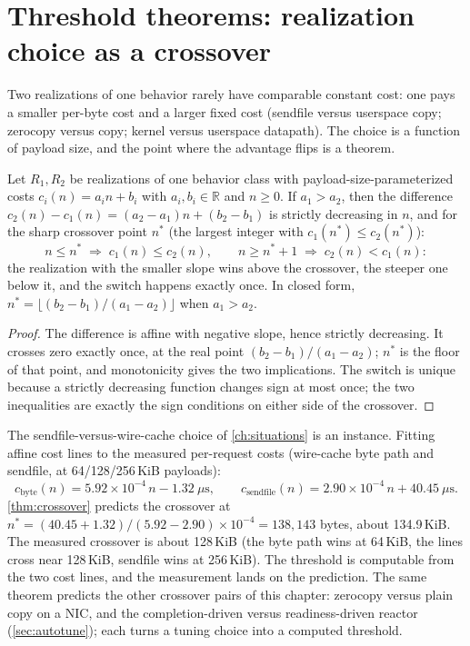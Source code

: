 \section{Threshold theorems: realization choice as a crossover}\label{sec:threshold}

Two realizations of one behavior rarely have comparable constant cost:
one pays a smaller per-byte cost and a larger fixed cost (sendfile
versus userspace copy; zerocopy versus copy; kernel versus userspace
datapath). The choice is a function of payload size, and the point
where the advantage flips is a theorem.

\begin{theorem}\label{thm:58}\label{thm:crossover}
Let $R_1, R_2$ be realizations of one behavior class with
payload-size-parameterized costs $c_i (n) = a_i n + b_i$ with
$a_i, b_i \in \mathbb{R}$ and $n \geq 0$. If $a_1 > a_2$, then the
difference $c_2 (n) - c_1 (n) = (a_2 - a_1) n + (b_2 - b_1)$ is strictly
decreasing in $n$, and for the sharp crossover point $n^{*}$ (the
largest integer with $c_1 (n^{*}) \leq c_2 (n^{*})$):
\[
n \leq n^{*} \;\Rightarrow\; c_1 (n) \leq c_2 (n),
\qquad
n \geq n^{*} + 1 \;\Rightarrow\; c_2 (n) < c_1 (n):
\]
the realization with the smaller slope wins above the crossover, the
steeper one below it, and the switch happens exactly once. In closed
form, $n^{*} = \lfloor (b_2 - b_1)/(a_1 - a_2) \rfloor$ when
$a_1 > a_2$.
\end{theorem}

\begin{proof}
The difference is affine with negative slope, hence strictly
decreasing. It crosses zero exactly once, at the real point
$(b_2 - b_1)/(a_1 - a_2)$; $n^{*}$ is the floor of that point, and
monotonicity gives the two implications. The switch is unique because
a strictly decreasing function changes sign at most once; the two
inequalities are exactly the sign conditions on either side of the
crossover.
\end{proof}

\begin{remark}
The sendfile-versus-wire-cache choice of \autoref{ch:situations} is an
instance. Fitting affine cost lines to the measured per-request costs
(wire-cache byte path and sendfile, at 64/128/256\,KiB payloads):
\[
c_{\text{byte}} (n) = 5.92\times 10^{-4}\, n - 1.32\ \mu\mathrm{s},
\qquad
c_{\text{sendfile}} (n) = 2.90\times 10^{-4}\, n + 40.45\ \mu\mathrm{s}.
\]
\autoref{thm:crossover} predicts the crossover at
$n^{*} = (40.45 + 1.32)/(5.92 - 2.90) \times 10^{-4} = 138{,}143$ bytes,
about 134.9\,KiB. The measured crossover is about 128\,KiB (the byte
path wins at 64\,KiB, the lines cross near 128\,KiB, sendfile wins at
256\,KiB). The threshold is computable from the two cost lines, and the
measurement lands on the prediction. The same theorem predicts the
other crossover pairs of this chapter: zerocopy versus plain copy on a
NIC, and the completion-driven versus readiness-driven reactor
(\autoref{sec:autotune}); each turns a tuning choice into a computed
threshold.
\end{remark}

